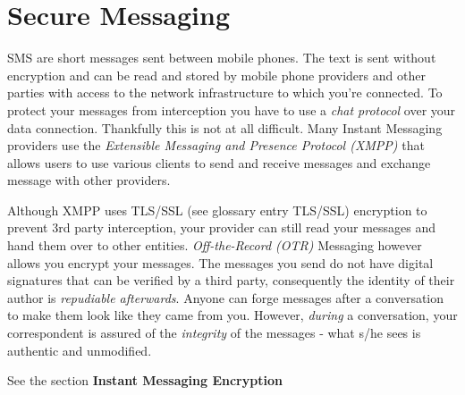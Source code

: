 \section{Secure Messaging}

SMS are short messages sent between mobile phones. The text is sent
without encryption and can be read and stored by mobile phone providers
and other parties with access to the network infrastructure to which
you're connected. To protect your messages from interception you have to
use a \emph{chat protocol} over your data connection. Thankfully this is
not at all difficult. Many Instant Messaging providers use the
\emph{Extensible Messaging and Presence Protocol (XMPP)} that allows
users to use various clients to send and receive messages and exchange
message with other providers.

Although XMPP uses TLS/SSL (see glossary entry TLS/SSL) encryption to
prevent 3rd party interception, your provider can still read your
messages and hand them over to other entities. \emph{Off-the-Record
(OTR)} Messaging however allows you encrypt your messages. The messages
you send do not have digital signatures that can be verified by a third
party, consequently the identity of their author is \emph{repudiable
afterwards}. Anyone can forge messages after a conversation to make them
look like they came from you. However, \emph{during} a conversation,
your correspondent is assured of the \emph{integrity} of the messages -
what s/he sees is authentic and unmodified.

See the section \textbf{Instant Messaging Encryption}
